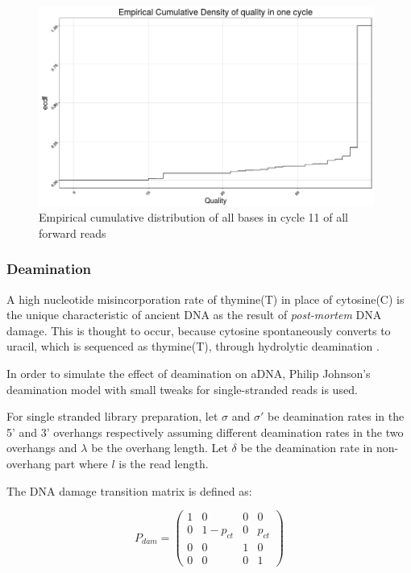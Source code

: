 \documentclass[11pt,a4paper]{report}
\begin{document}
\begin{figure}[H]
\centering
\includegraphics[width=11cm]{pictures/Rplot_ecdf.png}
\caption{Empirical cumulative distribution of all bases in cycle 11 of all forward 
reads}
\label{CDF}
\end{figure}


\subsubsection{Deamination} \label{Deamination}

A high nucleotide misincorporation rate of thymine(T) in place of
cytosine(C) is the unique characteristic of ancient DNA as the result of
\emph{post-mortem} DNA damage.  This is thought to occur, because
cytosine spontaneously converts to uracil, which is sequenced as
thymine(T), through hydrolytic deamination
\cite{mapdamage2}\cite{damagepattern}.

In order to simulate the effect of deamination on aDNA, 
Philip Johnson's deamination model\cite{mapdamage2}  
with small tweaks for single-stranded reads is used.

For single stranded library preparation,
let $\sigma$ and $\sigma'$ be deamination rates in the 5' 
and 3' overhangs respectively assuming different deamination rates 
in the two overhangs and $\lambda$ be the overhang length. 
Let  $\delta$ be the deamination rate in non-overhang part 
where $l$ is the read length.


The DNA damage transition matrix is defined as:

$$ P_{dam} = 
 \begin{pmatrix}
  1 & 0 & 0 & 0 \\
  0 & 1-p_{ct} & 0 & p_{ct} \\
  0  & 0  & 1 & 0  \\
  0 & 0 & 0 & 1 
 \end{pmatrix}$$
 
\end{document}
